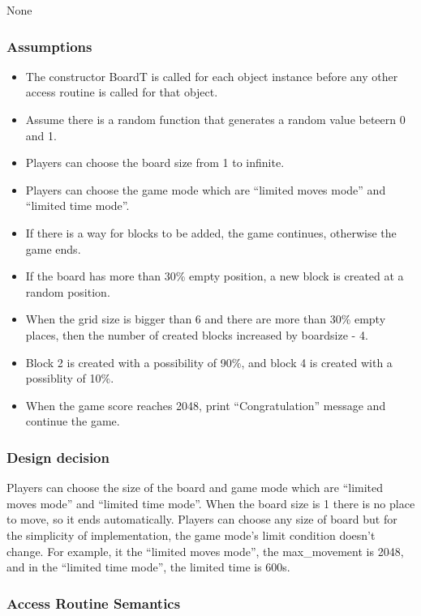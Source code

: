 \documentclass[12pt]{article}
\begin{document}
None

\subsubsection* {Assumptions}

\begin{itemize}
  \item The constructor BoardT is called for each object instance before any other access routine 
  is called for that object. 
  \item Assume there is a random function that generates a random value beteern 0 and 1.
  \item Players can choose the board size from 1 to infinite.
  \item Players can choose the game mode which are ``limited moves mode'' and ``limited time mode''.
  \item If there is a way for blocks to be added, the game continues, otherwise the game ends.
  \item If the board has more than 30\% empty position, a new block is created at a random position. 
  \item When the grid size is bigger than 6 and there are more than 30\% empty places, then the number of created blocks increased by boardsize - 4.
  \item Block 2 is created with a possibility of 90\%, and block 4 is created with a possiblity of 10\%. 
  \item When the game score reaches 2048, print ``Congratulation'' message and continue the game.
\end{itemize}

\subsubsection* {Design decision}

Players can choose the size of the board and game mode which are ``limited moves mode'' and ``limited time mode''. When the board size is 1 there is no place to move, so it ends automatically. Players can choose any size of board but for the simplicity of implementation, the game mode's limit condition doesn't change. For example, it the ``limited moves mode'', the max\_movement is 2048, and in the ``limited time mode'', the limited time is 600s. 

\subsubsection* {Access Routine Semantics}
\end{document}
